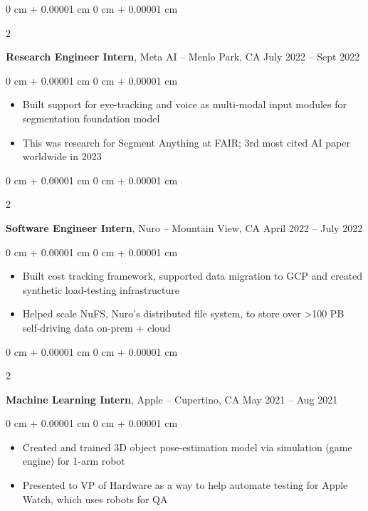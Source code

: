 \documentclass[10pt, letterpaper]{article}
\newenvironment{highlights}{
    \begin{itemize}[
        topsep=0.10 cm,
        parsep=0.10 cm,
        partopsep=0pt,
        itemsep=0pt,
        leftmargin=0 cm + 10pt
    ]
}{
    \end{itemize}
} %
\newenvironment{onecolentry}{
    \begin{adjustwidth}{
        0 cm + 0.00001 cm
    }{
        0 cm + 0.00001 cm
    }
}{
    \end{adjustwidth}
} %
\newenvironment{twocolentry}[2][]{
    \onecolentry
    \def\secondColumn{#2}
    \setcolumnwidth{\fill, 4.5 cm}
    \begin{paracol}{2}
}{
    \switchcolumn \raggedleft \secondColumn
    \end{paracol}
    \endonecolentry
} %
\begin{document}
        \vspace{0.2 cm}

        \begin{twocolentry}{
            July 2022 – Sept 2022
        }
            \textbf{Research Engineer Intern}, Meta AI -- Menlo Park, CA\end{twocolentry}

        \vspace{0.10 cm}
        \begin{onecolentry}
            \begin{highlights}
                \item Built support for eye-tracking and voice as  multi-modal input modules for segmentation foundation model
                \item This was research for Segment Anything at FAIR; 3rd most cited AI paper worldwide in 2023
            \end{highlights}
        \end{onecolentry}

        \vspace{0.2 cm}


        \begin{twocolentry}{
            April 2022 – July 2022
        }
            \textbf{Software Engineer Intern}, Nuro -- Mountain View, CA\end{twocolentry}

        \vspace{0.10 cm}
        \begin{onecolentry}
            \begin{highlights}
                \item Built cost tracking framework, supported data migration to GCP and created synthetic load-testing infrastructure
                \item Helped scale NuFS, Nuro's distributed file system, to store over >100 PB self-driving data on-prem + cloud
            \end{highlights}
        \end{onecolentry}

        \vspace{0.2 cm}

        \begin{twocolentry}{
            May 2021 – Aug 2021
        }
            \textbf{Machine Learning Intern}, Apple -- Cupertino, CA\end{twocolentry}

        \vspace{0.10 cm}
        \begin{onecolentry}
            \begin{highlights}
                \item Created and trained 3D object pose-estimation model via simulation (game engine) for 1-arm robot
                \item Presented to VP of Hardware as a way to help automate testing for Apple Watch, which uses robots for QA
            \end{highlights}
        \end{onecolentry}
\end{document}
